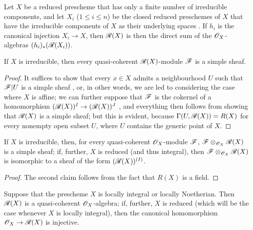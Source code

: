 \begin{cor}[7.3.4]
\label{1.7.3.4}
Let $X$ be a reduced prescheme that has only a finite number of irreducible components, and let $X_i$ ($1\leqslant i\leqslant n$) be the closed reduced preschemes of $X$ that have the irreducible components of $X$ as their underlying spaces .
If $h_i$ is the canonical injection $X_i\to X$, then $\mathscr{R}(X)$ is then the direct sum of the $\mathscr{O}_X$-algebras $(h_i)_*(\mathscr{R}(X_i))$.
\end{cor}

\begin{cor}[7.3.5]
\label{1.7.3.5}
If $X$ is irreducible, then every quasi-coherent $\mathscr{R}(X)$-module $\mathscr{F}$ is a simple sheaf.
\end{cor}

\begin{proof}
\label{proof-1.7.3.5}
It suffices to show that every $x\in X$ admits a neighbourhood $U$ such that $\mathscr{F}|U$ is a simple sheaf , or, in other words, we are led to considering the case where $X$ is affine; we can further suppose that $\mathscr{F}$ is the cokernel of a homomorphism $(\mathscr{R}(X))^{I}\to(\mathscr{R}(X))^{J}$ , and everything then follows from showing that $\mathscr{R}(X)$ is a simple sheaf; but this is evident, because $\Gamma(U,\mathscr{R}(X))=R(X)$ for every nonempty open subset $U$, where $U$ contains the generic point of $X$.
\end{proof}

\begin{cor}[7.3.6]
\label{1.7.3.6}
If $X$ is irreducible, then, for every quasi-coherent $\mathscr{O}_X$-module $\mathscr{F}$, $\mathscr{F}\otimes_{\mathscr{O}_X}\mathscr{R}(X)$ is a simple sheaf; if, further, $X$ is reduced (and thus integral), then $\mathscr{F}\otimes_{\mathscr{O}_X}\mathscr{R}(X)$ is isomorphic to a sheaf of the form $(\mathscr{R}(X))^{(I)}$.
\end{cor}

\begin{proof}
\label{proof-1.7.3.6}
The second claim follows from the fact that $R(X)$ is a field.
\end{proof}

\begin{prop}[7.3.7]
\label{1.7.3.7}
Suppose that the prescheme $X$ is locally integral or locally Noetherian.
Then $\mathscr{R}(X)$ is a quasi-coherent $\mathscr{O}_X$-algebra; if, further, $X$ is reduced (which will be the case whenever $X$ is locally integral), then the canonical homomorphism $\mathscr{O}_X\to\mathscr{R}(X)$ is injective.
\end{prop}

